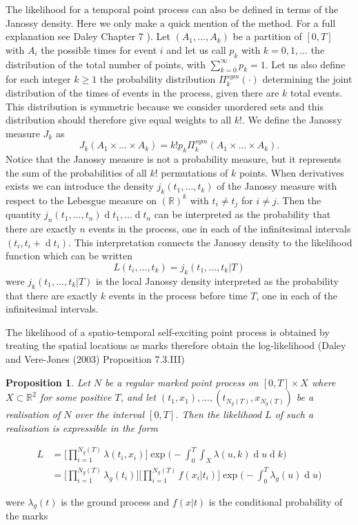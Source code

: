 \documentclass[11pt,a4paper]{article}
\renewcommand{\d}[1]{\ensuremath{\operatorname{d}\!{#1}}}
\newtheorem{proposition}[theorem]{Proposition}
\begin{document}
The likelihood for a temporal point process can also be defined in terms of the Janossy density. Here we only make a quick mention of the method. For a full explanation see Daley Chapter 7 \cite{Daley}).
Let $(A_1, \dots, A_k)$ be a partition of $[0, T]$ with $A_i$ the possible times for event $i$ and let us call $p_k$ with $k = 0, 1, \dots$ the distribution of the total number of points, with $\sum_{k=0}^\infty p_k = 1$. Let us also define for each integer $k \geq 1$ the probability distribution $\Pi_k^{sym}(\cdot)$ determining the joint distribution of the times of events in the process, given there are $k$ total events. This distribution is symmetric because we consider unordered sets and this distribution should therefore give equal weights to all $k!$. We define the Janossy measure $J_k$ as
\begin{equation*}
    J_k(A_1 \times \dots \times A_k) = k!p_k\Pi_k^{sym}(A_1 \times \dots \times A_k).
\end{equation*}
Notice that the Janossy measure is not a probability measure, but it represents the sum of the probabilities of all $k!$ permutations of $k$ points. 
When derivatives exists we can introduce the density $j_k(t_1, \dots, t_k)$ of the Janossy measure with respect to the Lebesgue measure on $(\mathbb{R})^k$ with $t_i \neq t_j$ for $i \neq j$. Then the quantity $j_n(t_1, \dots, t_n)\d t_1, \dots \d t_n$ can be interpreted as the probability that there are exactly $n$ events in the process, one in each of the infinitesimal intervals $(t_i, t_i+\d t_i)$. This interpretation connects the Janossy density to the likelihood function which can be written
\begin{equation*}
    L(t_i,\dots, t_k) = j_k(t_1, \dots, t_k | T)
\end{equation*}
were $j_k(t_1, \dots, t_k | T)$ is the local Janossy density interpreted as the probability that there are exactly $k$ events in the process before time $T$, one in each of the infinitesimal intervals.

The likelihood of a spatio-temporal self-exciting point process is obtained by treating the spatial locations as marks therefore obtain the log-likelihood (Daley and Vere-Jones (2003) Proposition 7.3.III) \cite{Daley}

\begin{proposition}
    Let $N$ be a regular marked point process on $[0, T] \times X$ where $X \subset \mathbb{R}^2$ for some positive $T$, and let $(t_1, x_1), \dots, (t_{N_g(T)}, x_{N_g(T)})$ be a realisation of $N$ over the interval $[0, T]$. Then the likelihood $L$ of such a realisation is expressible  in the form
    
    \begin{align*}
        L &= \Bigg[ \prod_{i=1}^{N_g(T)} \lambda(t_i, x_i) \Bigg]\exp \Bigg( -\int_{0}^{T} \int_X \lambda(u, k) \d u \d k \Bigg) \\
        &= \Bigg[ \prod_{i=1}^{N_g(T)} \lambda_g(t_i) \Bigg] \Bigg[ \prod_{i=1}^{N_g(T)} f(x_i | t_i) \Bigg]\exp \Bigg( -\int_{0}^{T} \lambda_g(u) \d u \Bigg)
    \end{align*}
\end{proposition}
were $\lambda_g(t)$ is the ground process and $f(x | t)$ is the conditional probability of the marks 
\end{document}
